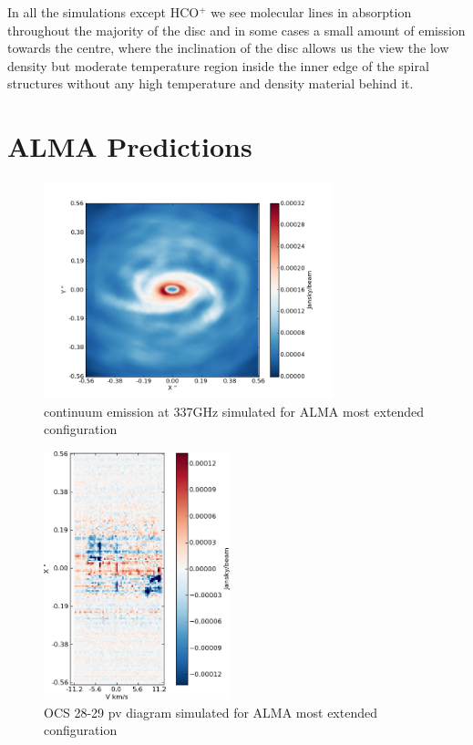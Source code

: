 \documentclass[useAMS,usenatbib]{mn2e}
\begin{document}
In all the simulations except HCO$^+$ we see molecular lines in absorption throughout the majority of the disc and in some cases a small amount of emission towards the centre, where the inclination of the disc allows us the view the low density but moderate temperature region inside the inner edge of the spiral structures without any high temperature and density material behind it.\newline




\section{ALMA Predictions} \label{sec:alma_predictions}



\begin{figure}
 \includegraphics[width=84mm]{Figures/sim/casa_cont_337GHz.png}

 \caption{continuum emission at 337GHz simulated for ALMA most extended configuration}
\end{figure}

\begin{figure}
 \includegraphics[width=54mm]{Figures/sim/casa_OCS_28-27_pv.png}

 \caption{OCS 28-29 pv diagram simulated for ALMA most extended configuration}
\end{figure}
\end{document}
